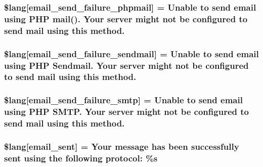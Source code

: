 \subsubsection[{\$lang}]{\setlength{\rightskip}{0pt plus 5cm}\$lang\mbox{[}\textquotesingle{}email\+\_\+send\+\_\+failure\+\_\+phpmail\textquotesingle{}\mbox{]} = \textquotesingle{}Unable to send email using P\+H\+P mail(). Your server might not be configured to send mail using this method.\textquotesingle{}}\label{email__lang_8php_a99a2ce89426340b4c96a245b7874a99d}
\hypertarget{email__lang_8php_a0cfda188d86472ad2f3b96a67de75b4d}{}
\subsubsection[{\$lang}]{\setlength{\rightskip}{0pt plus 5cm}\$lang\mbox{[}\textquotesingle{}email\+\_\+send\+\_\+failure\+\_\+sendmail\textquotesingle{}\mbox{]} = \textquotesingle{}Unable to send email using P\+H\+P Sendmail. Your server might not be configured to send mail using this method.\textquotesingle{}}\label{email__lang_8php_a0cfda188d86472ad2f3b96a67de75b4d}
\hypertarget{email__lang_8php_a37e19fc7057ba5d5300dd3e83cefc5a2}{}
\subsubsection[{\$lang}]{\setlength{\rightskip}{0pt plus 5cm}\$lang\mbox{[}\textquotesingle{}email\+\_\+send\+\_\+failure\+\_\+smtp\textquotesingle{}\mbox{]} = \textquotesingle{}Unable to send email using P\+H\+P S\+M\+T\+P. Your server might not be configured to send mail using this method.\textquotesingle{}}\label{email__lang_8php_a37e19fc7057ba5d5300dd3e83cefc5a2}
\hypertarget{email__lang_8php_a7e5c67019fdffb596af1af5a94247ba9}{}
\subsubsection[{\$lang}]{\setlength{\rightskip}{0pt plus 5cm}\$lang\mbox{[}\textquotesingle{}email\+\_\+sent\textquotesingle{}\mbox{]} = \textquotesingle{}Your message has been successfully sent using the following protocol\+: \%s\textquotesingle{}}\label{email__lang_8php_a7e5c67019fdffb596af1af5a94247ba9}
\hypertarget{email__lang_8php_a78f8be783ca93e91af775994ddc87cb7}{}
